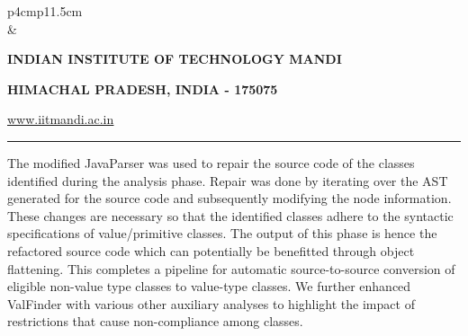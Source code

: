 \documentclass[12 pt, a4paper]{article}
\newcommand{\HRule}{\rule{\linewidth}{1mm}}
\begin{document}
\pagestyle{empty}
\vskip 0.2cm
	\begin{tabular}{p{4cm}p{11.5cm}}
		  \\
		& \centering \large\bf\phantom{Empty line}\\ 
		\rule{0pt}{1pt} \centering \large\bf{INDIAN INSTITUTE OF TECHNOLOGY MANDI} \\
		\rule{0pt}{1pt} \centering \large\bf{HIMACHAL PRADESH, INDIA - 175075} \\
		\rule{0pt}{1pt} \centering \underline{\href{www.iitmandi.ac.in}{www.iitmandi.ac.in}}\\
	\end{tabular}
\noindent

{\raggedleft{}\HRule}
\vskip 15pt
The modified JavaParser was used to repair the source code of the classes identified 
during the analysis phase. 
Repair was done by iterating over the AST generated for the source code and subsequently modifying 
the node information. 
These changes are necessary so that the identified classes adhere to the syntactic specifications of 
value/primitive classes.
The output of this phase is hence the refactored source code which can potentially be benefitted through 
object flattening. This completes a pipeline for automatic source-to-source conversion of eligible non-value type classes 
to value-type classes.
We further enhanced ValFinder with various other auxiliary analyses to highlight the impact of restrictions that
cause non-compliance among classes.
\end{document}
